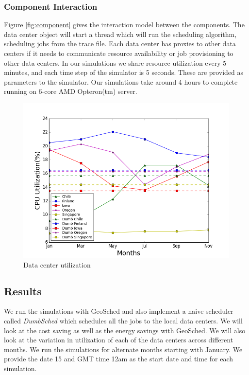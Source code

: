 \documentclass[conference,12pt]{IEEEtran}
\begin{document}
\subsubsection{Component Interaction}
Figure \ref{fig:component} gives the interaction model between the components. The data center object will start a thread which will run the scheduling algorithm, scheduling jobs from the trace file. Each data center has proxies to other data centers if it needs to communicate resource availability or job provisioning to other data centers. In our simulations we share resource utilization every 5 minutes, and each time step of the simulator is 5 seconds. These are provided as parameters to the simulator. Our simulations take around 4 hours to complete running on 6-core AMD Opteron(tm) server.

\begin{figure}[H]
\includegraphics[scale=0.45]{cpu_util}
\caption{ Data center utilization}
 \label{fig:dcutil}
\end{figure}

\subsection{Results}
We run the simulations with GeoSched and also implement a naive scheduler called \textit{DumbSched} which schedules all the jobs to the local data centers. We will look at the cost saving as well as the energy savings with GeoSched. We will also look at the variation in utilization of each of the data centers across different months. We run the simulations for alternate months starting with January. We provide the date 15 and GMT time 12am as the start date and time for each simulation.
\end{document}

